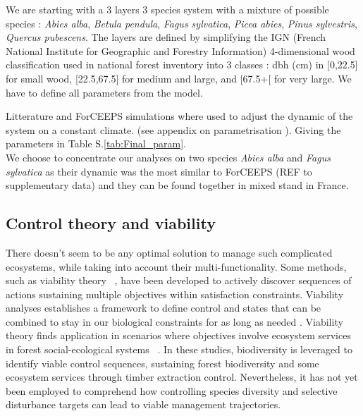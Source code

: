 \documentclass{article}
\begin{document}
We are starting with a 3 layers 3 species system with a mixture of possible species : \textit{Abies alba}, \textit{Betula pendula}, \textit{Fagus sylvatica}, \textit{Picea abies}, \textit{Pinus sylvestris}, \textit{Quercus pubescens}. The layers are defined by simplifying the IGN (French National Institute for Geographic and Forestry Information) 4-dimensional wood classification used in national forest inventory into 3 classes : dbh (cm) in [0,22.5] for small wood, [22.5,67.5] for medium and large, and [67.5+[ for very large. We have to define all parameters from the model.

Litterature and ForCEEPS simulations where used to adjust the dynamic of the system on a constant climate. (see appendix on parametrisation \autocite{bugmannEcologyMountainousForests1994,morinForestSuccessionGap2021}). Giving the parameters in Table S.\ref{tab:Final_param}.\\
We choose to concentrate our analyses on two species \textit{Abies alba} and \textit{Fagus sylvatica} as their dynamic was the most similar to ForCEEPS (REF to supplementary data) and they can be found together in mixed stand in France.\\

\subsection{Control theory and viability}

There doesn't seem to be any optimal solution to manage such complicated ecosystems, while taking into account their multi-functionality. Some methods, such as viability theory ~\autocite{aubinStochasticViabilityInvariance1990}, have been developed to actively discover sequences of actions sustaining multiple objectives within satisfaction constraints. Viability analyses establishes a framework to define control and states that can be combined to stay in our biological constraints for as long as needed \autocite{rougeExtendingViabilityTheory2013}.
Viability theory finds application in scenarios where objectives involve ecosystem services in forest social-ecological systems ~\autocite{mathiasUsingViabilityTheory2015, Houballah2021, Houballah2023}. In these studies, biodiversity is leveraged to identify viable control sequences, sustaining forest biodiversity and some ecosystem services through timber extraction control.
Nevertheless, it has not yet been employed to comprehend how controlling species diversity and selective disturbance targets can lead to viable management trajectories.
\end{document}
